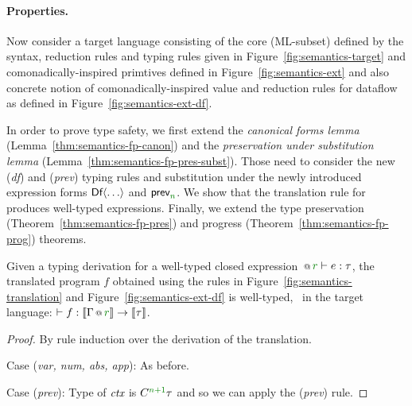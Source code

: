 \paragraph{Properties.}
Now consider a target language consisting of the core (ML-subset) defined by the syntax,
reduction rules and typing rules given in Figure~\ref{fig:semantics-target} and comonadically-inspired
primtives defined in Figure~\ref{fig:semantics-ext} and also concrete notion of comonadically-inspired
value and reduction rules for dataflow as defined in Figure~\ref{fig:semantics-ext-df}.

In order to prove type safety, we first extend the \emph{canonical forms lemma}
(Lemma~\ref{thm:semantics-fp-canon}) and the \emph{preservation under substitution lemma}
(Lemma~\ref{thm:semantics-fp-pres-subst}). Those need to consider the new (\emph{df})
and (\emph{prev}) typing rules and substitution under the newly introduced expression forms
$\textnormal{\sffamily Df}\langle\ldots\rangle$ and $\ident{prev}_{\cclrd{n}}$. We show that the translation
rule for  produces well-typed expressions. Finally, we extend the type preservation
(Theorem~\ref{thm:semantics-fp-pres}) and progress (Theorem~\ref{thm:semantics-fp-prog}) theorems.

\begin{theorem}
\label{thm:semantics-df-welltyped}
Given a typing derivation for a well-typed closed expression $\coctx{}{\cclrd{r}} \vdash e : \tau$,
the translated program $f$ obtained using the rules in Figure~\ref{fig:semantics-translation}
and Figure~\ref{fig:semantics-ext-df} is well-typed, \ie~in the target language: $\vdash f : \sem{\coctx{\Gamma}{\cclrd{r}}} \rightarrow \sem{\tau}$.
\end{theorem}
\begin{proof}
By rule induction over the derivation of the translation.

\vspace{0.5em}\noindent\hangindent=0.6cm
Case (\emph{var, num, abs, app}): As before.

\vspace{0.5em}\noindent\hangindent=0.6cm
Case (\emph{prev}): Type of $\textit{ctx}$ is $\ctyp{\cclrd{n+1}}\tau$ and so we can apply the (\emph{prev}) rule.
\end{proof}

